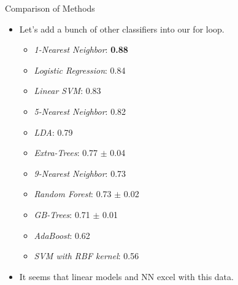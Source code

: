 \documentclass[10pt, aspectratio=169]{beamer} %
\begin{document}
\begin{frame}[fragile]{Comparison of Methods}
\begin{itemize}
	\item Let's add a bunch of other classifiers into our for loop.
	\begin{itemize}
		\item \emph{1-Nearest Neighbor}: \textbf{0.88}
		\item \emph{Logistic Regression}: 0.84
		\item \emph{Linear SVM}: 0.83
		\item \emph{5-Nearest Neighbor}: 0.82
		\item \emph{LDA}: 0.79
		\item \emph{Extra-Trees}: 0.77 $\pm$ 0.04
		\item \emph{9-Nearest Neighbor}: 0.73
		\item \emph{Random Forest}: 0.73 $\pm$ 0.02
		\item \emph{GB-Trees}: 0.71 $\pm$ 0.01
		\item \emph{AdaBoost}: 0.62		
		\item \emph{SVM with RBF kernel}: 0.56
	\end{itemize}
	\item It seems that linear models and NN excel with this data.
\end{itemize}
\end{frame}
\end{document}
